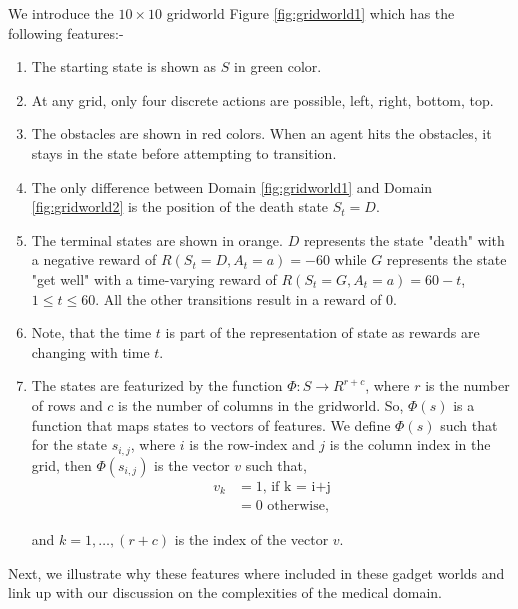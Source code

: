 We introduce the $10 \times 10$ gridworld Figure \ref{fig:gridworld1} which has the following features:-

\begin{enumerate}
\item The starting state is shown as $S$ in green color.
\item At any grid, only four discrete actions are possible, left, right, bottom, top.
\item The obstacles are shown in red colors. When an agent hits the obstacles, it stays in the state before attempting to transition.
\item The only difference between Domain \ref{fig:gridworld1} and Domain \ref{fig:gridworld2} is the position of the death state $S_t = D$. 
\item The terminal states are shown in orange. $D$ represents the state "death" with a negative reward of $R(S_t = D, A_t = a) = -60$ while $G$ represents the state "get well" with a time-varying reward of $R(S_t = G, A_t = a) = 60 - t$, $1\leq t \leq 60$. All the other transitions result in a reward of $0$.
\item Note, that the time $t$ is part of the representation of state as rewards are changing with time $t$.
\item The states are featurized by the function $\Phi: S \rightarrow R^{r+c}$, where $r$ is the number of rows and $c$ is the number of columns in the gridworld. So, $\Phi(s)$ is a function that maps states to vectors of features. We define $\Phi(s)$ such that for the state $s_{i,j}$, where $i$ is the row-index and $j$ is the column index in the grid, then $\Phi(s_{i,j})$ is the vector $v$ such that,
\begin{align*}
v_{k} &= 1 \text{, if k = i+j}\\
&= 0 \text{ otherwise,}
\end{align*}

and $k=1,\ldots,(r+c)$ is the index of the vector $v$.
\end{enumerate}

Next, we illustrate why these features where included in these gadget worlds and link up with our discussion on the complexities of the medical domain.

